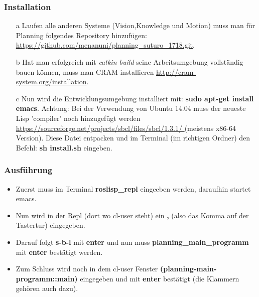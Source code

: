 \documentclass{suturo}
\begin{document}
\subsubsection{Installation}
\begin{itemize}


\item[a] Laufen alle anderen Systeme (Vision,Knowledge und Motion) muss man für Planning folgendes Repository hinzufügen: \url{https://github.com/menanuni/planning_suturo_1718.git}. 

\item[b] Hat man erfolgreich mit \textit{catkin build} seine Arbeitsumgebung vollständig bauen können, muss man CRAM installieren \url{http://cram-system.org/installation}.

\item[c] Nun wird die Entwicklungsumgebung installiert mit: \textbf{sudo apt-get install emacs}. Achtung: Bei der Verwendung von Ubuntu 14.04 muss der neueste Lisp 'compiler' noch hinzugefügt werden \url{https://sourceforge.net/projects/sbcl/files/sbcl/1.3.1/
} (meistens x86-64 Version). Diese Datei entpacken und im Terminal (im richtigen Ordner) den Befehl: \textbf{sh install.sh} eingeben.
\end{itemize}

\subsubsection{Ausführung}
\begin{itemize}

\item Zuerst muss im Terminal \textbf{roslisp\_repl} eingeeben werden, daraufhin startet emacs. 

\item Nun wird in der Repl (dort wo cl-user steht) ein \textbf{,} (also das Komma auf der Tastertur) eingegeben.

\item Darauf folgt \textbf{s-b-l} mit \textbf{enter} und nun muss \textbf{planning\_main\_programm} mit \textbf{enter} bestätigt werden.

\item Zum Schluss wird noch in dem cl-user Fenster \textbf{(planning-main-programm::main)} eingegeben und mit \textbf{enter} bestätigt (die Klammern gehören auch dazu).
\end{itemize}
\end{document}
